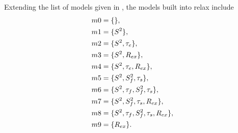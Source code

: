 \begin{htmlonly}
\begin{htmlonly}
Extending the list of models given in \citet{Mandel95, Fushman97, Orekhov99b, Korzhnev01, Zhuravleva04}, the models built into relax include
\begin{subequations}
\renewcommand{\theequation}{\theparentequation .\arabic{equation}}
\addtocounter{equation}{-1}
\begin{align}
 m0 &= \{\},                                   \label{model: m0} \\
 m1 &= \{S^2\},                                \label{model: m1} \\
 m2 &= \{S^2, \tau_e\},                        \label{model: m2} \\
 m3 &= \{S^2, R_{ex}\},                        \label{model: m3} \\
 m4 &= \{S^2, \tau_e, R_{ex}\},                \label{model: m4} \\
 m5 &= \{S^2, S^2_f, \tau_s\},                 \label{model: m5} \\
 m6 &= \{S^2, \tau_f, S^2_f, \tau_s\},         \label{model: m6} \\
 m7 &= \{S^2, S^2_f, \tau_s, R_{ex}\},         \label{model: m7} \\
 m8 &= \{S^2, \tau_f, S^2_f, \tau_s, R_{ex}\}, \label{model: m8} \\
 m9 &= \{R_{ex}\}.                             \label{model: m9}
\end{align}
\end{subequations}


\end{htmlonly}
\end{htmlonly}
